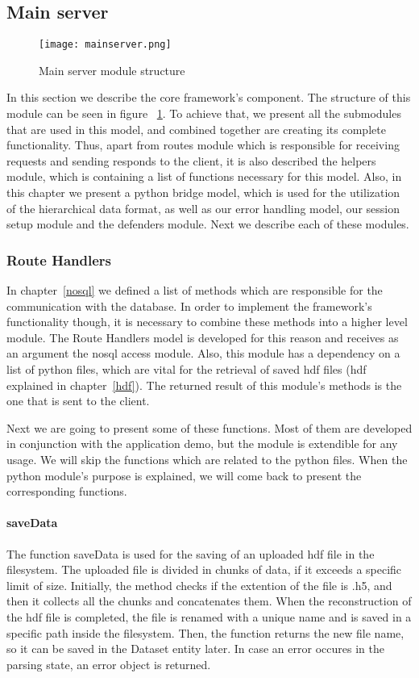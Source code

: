 \subsection{Main server}
\begin{figure}
	\centerline{\texttt{[image: mainserver.png]}}
	\caption{Main server module structure}
	\label{mainserver}
\end{figure}
In this section we describe the core framework's component.  The structure of this module can be seen in figure ~\ref{mainserver}. To achieve that, we present all the submodules that are used in this model, and combined together are creating its complete functionality. Thus, apart from routes module which is responsible for receiving requests and sending responds to the client, it is also described the helpers module, which is containing a list of functions necessary for this model. Also, in this chapter we present a python bridge model, which is used for the utilization of the hierarchical data format, as well as our error handling model, our session setup module and the defenders module. Next we describe each of these modules.

\subsubsection{Route Handlers}
\label{helpers}
In chapter~\ref{nosql} we defined a list of methods which are responsible for the communication with the database. In order to implement the framework's functionality though, it is necessary to combine these methods into a higher level module. The Route Handlers model is developed for this reason and receives as an argument the nosql access module. Also, this module has a dependency on a list of python files, which are vital for the retrieval of saved hdf files (hdf explained in chapter~\ref{hdf}). The returned result of this module's methods is the one that is sent to the client. \par
	Next we are going to present some of these functions. Most of them are developed in conjunction with the application demo, but the module is extendible for any usage. We will skip the functions which are related to the python files. When the python module's purpose is explained, we will come back to present the corresponding functions.

\paragraph{saveData}
The function saveData is used for the saving of an uploaded hdf file in the filesystem. The uploaded file is divided in chunks of data, if it exceeds a specific limit of size. Initially, the method checks if the extention of the file is .h5, and then it collects all the chunks and concatenates them. When the reconstruction of the hdf file is completed, the file is renamed with a unique name and is saved in a specific path inside the filesystem. Then, the function returns the new file name, so it can be saved in the Dataset entity later. In case an error occures in the parsing state, an error object is returned.


